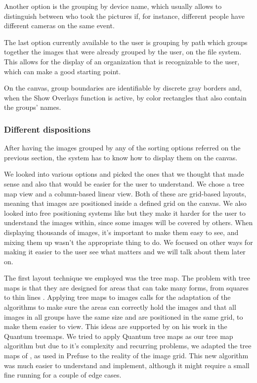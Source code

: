Another option is the grouping by device name, which usually allows to distinguish between who took the pictures if, for instance, different people have different cameras on the same event.

The last option currently available to the user is grouping by path which groups together the images that were already grouped by the user, on the file system. This allows for the display of an organization that is recognizable to the user, which can make a good starting point.

On the canvas, group boundaries are identifiable by discrete gray borders and, when the Show Overlays function is active, by color rectangles that also contain the groups' names.


\subsubsection{Different dispositions}

After having the images grouped by any of the sorting options referred on the previous section, the system has to know how to display them on the canvas.

We looked into various options  and picked the ones that we thought that made sense and also that would be easier for the user to understand. We chose a tree map view and a column-based linear view. Both of these are grid-based layouts, meaning that images are positioned inside a defined grid on the canvas. We also looked into free positioning systems like  but they make it harder for the user to understand the images within, since some images will be covered by others. When displaying thousands of images, it's important to make them easy to see, and mixing them up wasn't the appropriate thing to do. We focused on other ways for making it easier to the user see what matters and we will talk about them later on.

The first layout technique we employed was the tree map. The problem with tree maps is that they are designed for areas that can take many forms, from squares to thin lines . Applying tree maps to images calls for the adaptation of the algorithms to make sure the areas can correctly hold the images and that all images in all groups have the same size and are positioned in the same grid, to make them easier to view. This ideas are supported by  on his work in the Quantum treemaps. We tried to apply Quantum tree maps as our tree map algorithm but due to it's complexity and recurring problems, we adapted the tree maps of , as used in Prefuse   to the reality of the image grid. This new algorithm was much easier to understand and implement, although  it might require a small fine running for a couple of edge cases.

